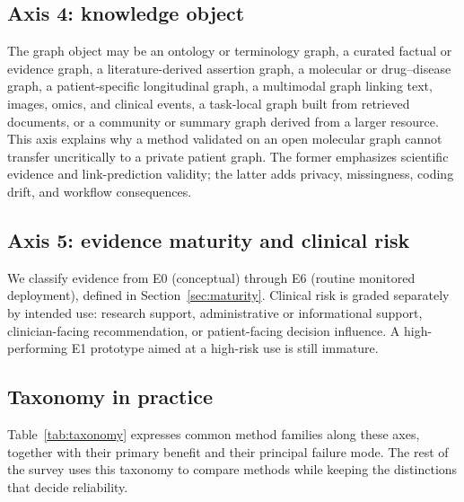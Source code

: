 \subsection{Axis 4: knowledge object}

The graph object may be an ontology or terminology graph, a curated factual or evidence graph, a literature-derived assertion graph, a molecular or drug--disease graph, a patient-specific longitudinal graph, a multimodal graph linking text, images, omics, and clinical events, a task-local graph built from retrieved documents, or a community or summary graph derived from a larger resource. This axis explains why a method validated on an open molecular graph cannot transfer uncritically to a private patient graph. The former emphasizes scientific evidence and link-prediction validity; the latter adds privacy, missingness, coding drift, and workflow consequences.

\subsection{Axis 5: evidence maturity and clinical risk}

We classify evidence from E0 (conceptual) through E6 (routine monitored deployment), defined in Section~\ref{sec:maturity}. Clinical risk is graded separately by intended use: research support, administrative or informational support, clinician-facing recommendation, or patient-facing decision influence. A high-performing E1 prototype aimed at a high-risk use is still immature.

\subsection{Taxonomy in practice}

Table~\ref{tab:taxonomy} expresses common method families along these axes, together with their primary benefit and their principal failure mode. The rest of the survey uses this taxonomy to compare methods while keeping the distinctions that decide reliability.

